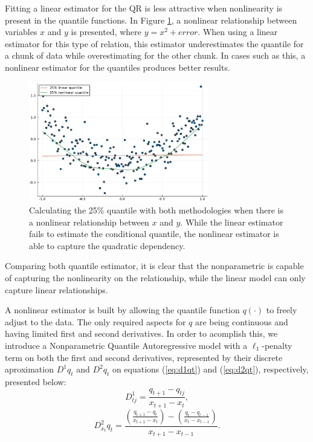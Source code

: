 Fitting a linear estimator for the QR is less attractive when nonlinearity is present in the quantile functions. In Figure \ref{fig:nonlinear}, a nonlinear relationship between variables $x$ and $y$ is presented, where $y = x^2 + error$. When using a linear estimator for this type of relation, this estimator underestimates the quantile for a chunk of data while overestimating for the other chunk. In cases such as this, a nonlinear estimator for the quantiles produces better results.
\begin{figure}[t]
	\begin{center}
	  \includegraphics[width=0.7\textwidth]{Images/nonlinear}
	\end{center}
	\caption{Calculating the 25\% quantile with both methodologies when there is a nonlinear relationship between $x$ and $y$. While the linear estimator fails to estimate the conditional quantile, the nonlinear estimator is able to capture the quadratic dependency.}
	\label{fig:nonlinear}
\end{figure}
Comparing both quantile estimator, it is clear that the nonparametric is capable of capturing the nonlinearity on the relationship, while the linear model can only capture linear relationships.

A nonlinear estimator is built by allowing the quantile function $q(\cdot)$ to freely adjust to the data. The only required aspects for $q$ are being continuous and having limited first and second derivatives.
In order to acomplish this, we introduce a Nonparametric Quantile Autoregressive model with a $\ell_{1}$-penalty term on both the first and second derivatives, represented by their discrete aproximation $D^1 q_t$ and $D^2 q_t$ on equations (\ref{eq:d1qt}) and (\ref{eq:d2qt}), respectively, presented below:
\begin{equation}
  D^{1}_{tj}=\frac{q_{t+1}-q_{tj}}{x_{t+1}-x_{t}},\label{eq:d1qt}
\end{equation}
\begin{equation}
D_{x_{t}}^{2}q_{t}=\frac{\left(\frac{q_{t+1}-q_{t}}{x_{t+1}-x_{t}}\right)-\left(\frac{q_{t}-q_{t-1}}{x_{t}-x_{t-1}}\right)}{x_{t+1}- x_{t-1}}.\label{eq:d2qt}
\end{equation}


